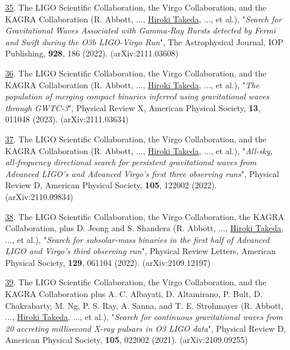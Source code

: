 \documentclass[uplatex, 12pt]{article}
\begin{document}
\begin{enumerate}
\item[\uline{35}.] The LIGO Scientific Collaboration, the Virgo Collaboration, and the KAGRA Collaboration (R. Abbott, ..., \uline{Hiroki Takeda}, ..., et al.),
"\emph{Search for Gravitational Waves Associated with Gamma-Ray Bursts detected by Fermi and Swift during the O3b LIGO-Virgo Run}",
The Astrophysical Journal, IOP Publishing, {\bf 928}, 186 (2022).
(arXiv:2111.03608) \\

\item[\uline{36}.] The LIGO Scientific Collaboration, the Virgo Collaboration, and the KAGRA Collaboration (R. Abbott, ..., \uline{Hiroki Takeda}, ..., et al.), "\emph{The population of merging compact binaries inferred using gravitational waves through GWTC-3}", Physical Review X, American Physical Society, {\bf 13}, 011048 (2023). (arXiv:2111.03634)\\

\item[\uline{37}.] The LIGO Scientific Collaboration, the Virgo Collaboration, and the KAGRA Collaboration (R. Abbott, ..., \uline{Hiroki Takeda}, ..., et al.), "\emph{All-sky, all-frequency directional search for persistent gravitational waves from Advanced LIGO's and Advanced Virgo's first three observing runs}", Physical Review D, American Physical Society, {\bf 105}, 122002 (2022). (arXiv:2110.09834)\\

\item[\uline{38}.] The LIGO Scientific Collaboration, the Virgo Collaboration, the KAGRA Collaboration, plus D. Jeong and S. Shandera (R. Abbott, ..., \uline{Hiroki Takeda}, ..., et al.), "\emph{Search for subsolar-mass binaries in the first half of Advanced LIGO and Virgo's third observing run}", Physical Review Letters, American Physical Society, {\bf 129}, 061104 (2022). (arXiv:2109.12197)\\

\item[\uline{39}.] The LIGO Scientific Collaboration, the Virgo Collaboration, and the KAGRA Collaboration plus A. C. Albayati, D. Altamirano, P. Bult, D. Chakrabarty, M. Ng, P. S. Ray, A. Sanna, and T. E. Strohmayer (R. Abbott, ..., \uline{Hiroki Takeda}, ..., et al.), "\emph{Search for continuous gravitational waves from 20 accreting millisecond X-ray pulsars in O3 LIGO data}", Physical Review D, American Physical Society, {\bf 105}, 022002 (2021). (arXiv:2109.09255)\\


\end{enumerate}
\end{document}
